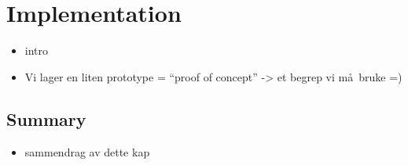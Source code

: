 \chapter{Implementation}
\label{chapter:implementation}

\begin{itemize}
  \item intro
  \item Vi lager en liten prototype = ``proof of concept'' -> et begrep vi m\aa~bruke =)
\end{itemize}





\section{Summary}
\label{sect:impl:summary}
\begin{itemize}
  \item sammendrag av dette kap
\end{itemize}